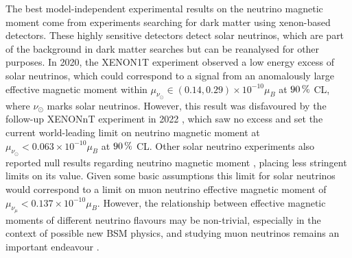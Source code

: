 The best model-independent experimental results on the neutrino magnetic moment come from experiments searching for dark matter using xenon-based detectors. These highly sensitive detectors detect solar neutrinos, which are part of the background in dark matter searches but can be reanalysed for other purposes. In 2020, the XENON1T experiment observed \cite{XENON1TExcessNuOnE2020.pdf} a low energy excess of solar neutrinos, which could correspond to a signal from an anomalously large effective magnetic moment within $\mu_{\nu_\odot}\in \left(0.14, 0.29\right)\times 10^{-10} \mu_B$ at $\unit[90]{\%}$ \gls{CL}, where $\nu_\odot$ marks solar neutrinos. However, this result was disfavoured by the follow-up XENONnT experiment in 2022 \cite{XENONnTFirstResults2022.pdf}, which saw no excess and set the current world-leading limit on neutrino magnetic moment at $\mu_{\nu_\odot}<0.063\times 10^{-10}\mu_B$ at $\unit[90]{\%}$ \gls{CL}. Other solar neutrino experiments also reported null results regarding neutrino magnetic moment \cite{LZNuMMResults2022.pdf,BorexinoLimit2017.pdf}, placing less stringent limits on its value. Given some basic assumptions \cite{BorexinoLimit2017.pdf, NuElmagInXENONnTKhan2023.pdf} this limit for solar neutrinos would correspond to a limit on muon neutrino effective magnetic moment of $\mu_{\nu_\mu}<0.137\times 10^{-10}\mu_B$. However, the relationship between effective magnetic moments of different neutrino flavours may be non-trivial, especially in the context of possible new \gls{BSM} physics, and studying muon neutrinos remains an important endeavour \cite{LargeNuMMJointFit2022.pdf}.




